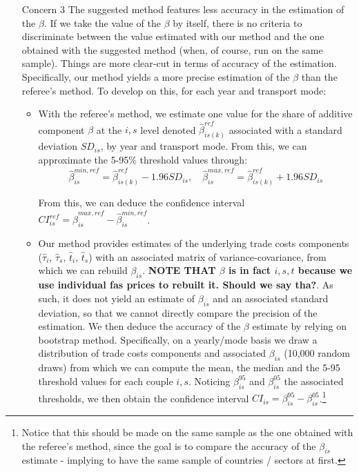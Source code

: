 \documentclass[a4paper,11pt]{article}
\begin{document}
\begin{itemize}
\item[Concern 3] The suggested method features less accuracy in the estimation of the $\beta$. If we take the value of the $\beta$ by itself, there is no criteria to discriminate between the value estimated with our method and the one obtained with the suggested method (when, of course, run on the same sample). Things are more clear-cut in terms of accuracy of the estimation. Specifically, our method yields a more precise estimation of the $\beta$ than the referee's method. To develop on this, for each year and transport mode:
    \begin{itemize}
    \item With the referee's method, we estimate one value for the share of additive component $\beta$ at the $i,s$ level denoted $\hat{\beta}^{ref}_{is(k)}$ associated with a standard deviation $SD_{is}$, by year and transport mode. From this, we can approximate the 5-95\% threshold values through:
        $$\hat{\beta}_{is}^{min,ref} = \hat{\beta}^{ref}_{is(k)} - 1.96 SD_{is},\quad \hat{\beta}_{is}^{max,ref} = \hat{\beta}^{ref}_{is(k)} + 1.96 SD_{is}$$

        From this, we can deduce the confidence interval $CI^{ref}_{is} = \hat{\beta}_{is}^{max,ref} - \hat{\beta}_{is}^{min,ref}$.

    \item  Our method provides estimates of the underlying trade costs components ($\widehat{\tau}_i$, $\widehat{\tau}_s$, $\widehat{t}_i$, $\widehat{t}_s$) with an associated matrix of variance-covariance, from which we can rebuild $\beta_{is}$. \textbf{NOTE THAT $\beta$ is in fact $i,s,t$ because we use individual fas prices to rebuilt it. Should we say tha?}. As such, it does not yield an estimate of $\beta_{is}$ and an associated standard deviation, so that we cannot directly compare the precision of the estimation. We then deduce the accuracy of the $\beta$ estimate by relying on bootstrap method. Specifically, on a yearly/mode basis we draw a distribution of trade costs components and associated $\beta_{is}$ (10,000 random draws) from which we can compute the mean, the median and the 5-95 threshold values for each couple $i,s$. Noticing $\beta_{is}^{95}$ and $\beta_{is}^{05}$ the associated thresholds, we then obtain the confidence interval $CI_{is}= \beta_{is}^{95}- \beta_{is}^{05}$.\footnote{Notice that this should be made on the same sample as the one obtained with the referee's method, since the goal is to compare the accuracy of the $\beta_{is}$ estimate - implying to have the same sample of countries / sectors at first. }


\end{itemize}
\end{itemize}
\end{document}
